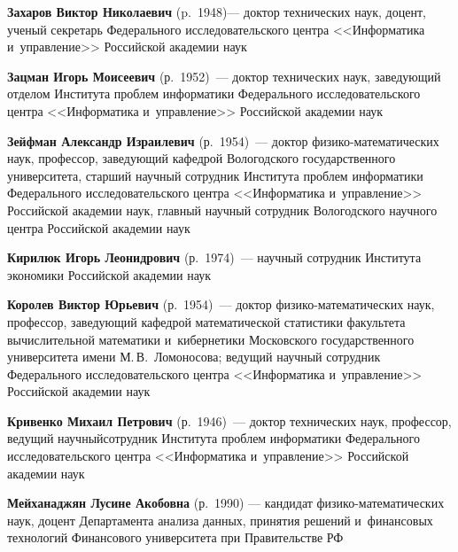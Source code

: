 \begin{multicols}{2}
\noindent
\textbf{Захаров Виктор Николаевич} (p.\ 1948)--- доктор технических наук, доцент, ученый 
секретарь Федерального исследовательского центра <<Информатика и~управление>> 
Российской академии наук

\vspace*{3pt}

\noindent
\textbf{Зацман Игорь Моисеевич} (р.\ 1952)~--- доктор тех\-нических наук, заведующий отделом 
Института
проб\-лем информатики Федерального исследовательского центра <<Информатика 
и~управление>>
Российской академии наук

\vspace*{3pt}

\noindent
\textbf{Зейфман Александр Израилевич} (р.\ 1954)~--- доктор 
фи\-зи\-ко-ма\-те\-ма\-ти\-че\-ских наук, профессор, заведующий кафедрой Вологодского государственного 
университета, старший научный сотрудник Института проб\-лем информатики 
Федерального исследовательского центра <<Информатика и~управ\-ле\-ние>> 
Российской академии наук, главный научный сотрудник Вологодского научного центра 
Российской академии наук

\vspace*{3pt}

\noindent
\textbf{Кирилюк Игорь Леонидрович} (р.\ 1974)~--- научный сотрудник Института 
экономики Российской академии наук

\vspace*{3pt}

\noindent
\textbf{Королев Виктор Юрьевич} (р.\ 1954)~--- доктор физико-математических наук, профессор, 
заведующий кафедрой математической статистики факультета вычислительной математики 
и~кибернетики Мос\-ков\-ско\-го государственного университета имени М.\,В.~Ломоносова;
ведущий научный сотрудник Федерального исследовательского центра <<Информатика 
и~управление>> Российской академии наук

\vspace*{3pt}

\noindent
\textbf{Кривенко Михаил Петрович} (р.\ 1946)~--- доктор технических наук, профессор, ведущий 
научный\linebreak сотрудник Института проб\-лем информатики Федерального исследовательского центра 
<<Информатика и~управление>> Российской академии наук

\vspace*{3pt}

\noindent
\textbf{Мейханаджян Лусине Акобовна} (р.\ 1990) ---
кандидат фи\-зи\-ко-ма\-те\-ма\-ти\-че\-ских наук, доцент Департамента анализа данных, 
принятия решений и~финансовых технологий Финансового университета при Правительстве РФ


\end{multicols}

